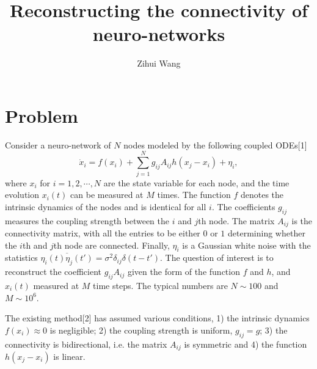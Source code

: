 \documentclass[11pt,a4paper]{article}
\title{Reconstructing the connectivity of neuro-networks}
\author{Zihui Wang}
\affiliation{Department of Physics, New York University\\
New York, NY 10003\\
United States}
\begin{document}
\maketitle

\section{Problem}
Consider a neuro-network of $N$ nodes modeled by the following coupled ODEs[1]
\begin{equation}
    \dot{x}_i = f(x_i) + \sum_{j=1}^N g_{ij}A_{ij}h(x_j-x_i)+\eta_i,
\end{equation}
where $x_i$ for $i=1,2,\cdots,N$ are the state variable for each node, and the time evolution $x_i(t)$ can be measured at $M$ times. The function $f$ denotes the intrinsic dynamics of the nodes and is identical for all $i$. The coefficients $g_{ij}$ measures the coupling strength between the $i$ and $j$th node. The matrix $A_{ij}$ is the connectivity matrix, with all the entries to be either $0$ or $1$ determining whether the $i$th and $j$th node are connected. Finally, $\eta_i$ is a Gaussian white noise with the statistics $\overline{\eta_i(t)\eta_j(t')}=\sigma^2\delta_{ij}\delta(t-t')$. The question of interest is to reconstruct the coefficient $g_{ij}A_{ij}$ given the form of the function $f$ and $h$, and $x_i(t)$ measured at $M$ time steps. The typical numbers are $N\sim100$ and $M\sim10^6$.

The existing method[2] has assumed various conditions, 1) the intrinsic dynamics $f(x_i)\approx0$ is negligible; 2) the coupling strength is uniform, $g_{ij}=g$; 3) the connectivity is bidirectional, i.e. the matrix $A_{ij}$ is symmetric and 4) the function $h(x_j-x_i)$ is linear.
\end{document}
